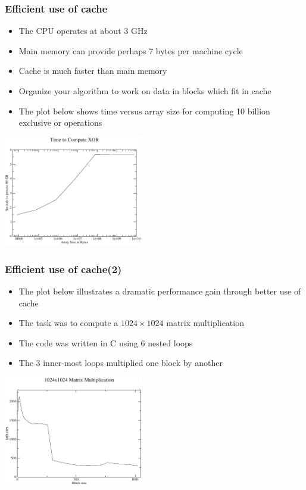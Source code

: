 \documentclass{beamer}
\begin{document}
\begin{frame}
    \frametitle{Efficient use of cache}
    \begin{itemize}
        \item The CPU operates at about 3 GHz
        \item Main memory can provide perhaps 7 bytes per machine cycle
        \item Cache is much faster than main memory
        \item Organize your algorithm to work on data in blocks which fit in cache
        \item The plot below shows time versus array size for computing 10 billion
              exclusive or operations
    \end{itemize}
\begin{center}
\includegraphics[width=2.4in]{xor.pdf}
\end{center}
\end{frame}

\begin{frame}
    \frametitle{Efficient use of cache(2)}
    \begin{itemize}
        \item The plot below illustrates a dramatic performance gain
              through better use of cache
        \item The task was to compute a $1024\times 1024$ matrix multiplication
        \item The code was written in C using 6 nested loops
        \item The 3 inner-most loops multiplied one block by another
    \end{itemize}
\begin{center}
\includegraphics[width=2.4in]{mm.pdf}
\end{center}
\end{frame}
\end{document}
